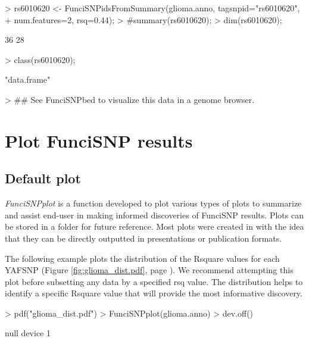 \documentclass[12pt,fullpage]{article}
\newcommand{\Rmethod}[1]{{\textit{#1}}}
\begin{document}
\begin{Schunk}
\begin{Sinput}
> rs6010620 <- FunciSNPidsFromSummary(glioma.anno, tagsnpid="rs6010620",
+ num.features=2, rsq=0.44);
> #summary(rs6010620);
> dim(rs6010620);
\end{Sinput}
\begin{Soutput}
[1] 36 28
\end{Soutput}
\begin{Sinput}
> class(rs6010620);
\end{Sinput}
\begin{Soutput}
[1] "data.frame"
\end{Soutput}
\begin{Sinput}
> ## See FunciSNPbed to visualize this data in a genome browser.
\end{Sinput}
\end{Schunk}

\section{Plot FunciSNP results}
\subsection{Default plot}

\Rmethod{FunciSNPplot} is a function developed to plot various types of plots to
summarize and assist end-user in making informed discoveries of FunciSNP
results. Plots can be stored in a folder for future reference. Most plots were
created in with the idea that they can be directly outputted in presentations or
publication formats.

The following example plots the distribution of the Rsquare values for each
YAFSNP (Figure \ref{fig:glioma_dist.pdf}, page
        \pageref{fig:glioma_dist.pdf}). We recommend attempting this plot before
subsetting any data by a specified rsq value. The distribution helps to identify
a specific Rsquare value that will provide the most informative discovery.

\begin{Schunk}
\begin{Sinput}
> pdf("glioma_dist.pdf")
> FunciSNPplot(glioma.anno)
> dev.off()
\end{Sinput}
\begin{Soutput}
null device 
          1 
\end{Soutput}
\end{Schunk}
\end{document}
